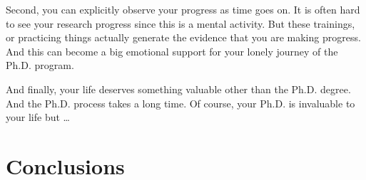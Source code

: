 \documentclass[11pt]{article}
\begin{document}
Second, you can explicitly observe your progress as time goes
on. It is often hard to see your research progress since this is a
mental activity. But these trainings, or practicing things actually
generate the evidence that you are making progress. And this can become
a big emotional support for your lonely journey of the Ph.D.
program.

And finally, your life deserves something valuable other than the Ph.D.
degree. And the Ph.D. process takes a long time. Of course, your Ph.D.
is invaluable to your life but \ldots


\section{Conclusions}
\end{document}
